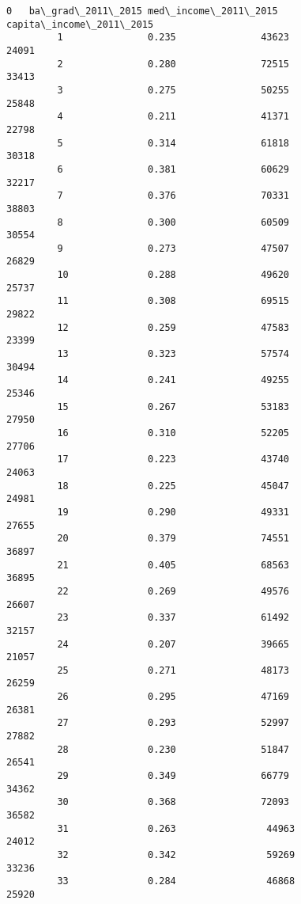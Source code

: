 \documentclass[11pt]{article}
\begin{document}
\begin{Verbatim}[commandchars=\\\{\}]
         0   ba\_grad\_2011\_2015 med\_income\_2011\_2015 capita\_income\_2011\_2015  
         1               0.235               43623                   24091   
         2               0.280               72515                   33413   
         3               0.275               50255                   25848   
         4               0.211               41371                   22798   
         5               0.314               61818                   30318   
         6               0.381               60629                   32217   
         7               0.376               70331                   38803   
         8               0.300               60509                   30554   
         9               0.273               47507                   26829   
         10              0.288               49620                   25737   
         11              0.308               69515                   29822   
         12              0.259               47583                   23399   
         13              0.323               57574                   30494   
         14              0.241               49255                   25346   
         15              0.267               53183                   27950   
         16              0.310               52205                   27706   
         17              0.223               43740                   24063   
         18              0.225               45047                   24981   
         19              0.290               49331                   27655   
         20              0.379               74551                   36897   
         21              0.405               68563                   36895   
         22              0.269               49576                   26607   
         23              0.337               61492                   32157   
         24              0.207               39665                   21057   
         25              0.271               48173                   26259   
         26              0.295               47169                   26381   
         27              0.293               52997                   27882   
         28              0.230               51847                   26541   
         29              0.349               66779                   34362   
         30              0.368               72093                   36582   
         31              0.263                44963                   24012  
         32              0.342                59269                   33236  
         33              0.284                46868                   25920  

\end{Verbatim}
\end{document}
